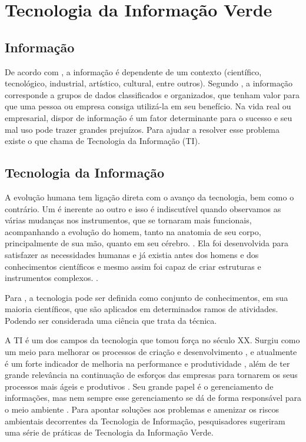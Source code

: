 %
%

\chapter{Tecnologia da Informação Verde}

\section{Informação}

De acordo com , a informação é dependente de um contexto (científico, tecnológico, industrial, artístico, cultural, entre outros). Segundo , a informação corresponde a grupos de dados classificados e organizados, que tenham valor para que uma pessoa ou empresa consiga utilizá-la em seu benefício. Na vida real ou empresarial, dispor de informação é um fator determinante para o sucesso e seu mal uso pode trazer grandes prejuízos. Para ajudar a resolver esse problema existe o que chama de Tecnologia da Informação (TI).

\section{Tecnologia da Informação}

A evolução humana tem ligação direta com o avanço da tecnologia, bem como o contrário. Um é inerente ao outro e isso é indiscutível quando observamos as várias mudanças nos instrumentos, que se tornaram mais funcionais, acompanhando a evolução do homem, tanto na anatomia de seu corpo, principalmente de sua mão, quanto em seu cérebro. \cite[p. 107-111]{acevedo1998ciencia}. Ela foi desenvolvida para satisfazer as necessidades humanas e já existia antes dos homens e dos conhecimentos científicos e mesmo assim foi capaz de criar estruturas e instrumentos complexos. \cite{acevedo1998ciencia, veraszto2004projeto}. 

Para , a tecnologia pode ser definida como conjunto de conhecimentos, em sua maioria científicos, que são aplicados em determinados ramos de atividades. Podendo ser considerada uma ciência que trata da técnica.

A TI é um dos campos da tecnologia que tomou força no século XX. Surgiu como um meio para melhorar os processos de criação e desenvolvimento \cite[p. 2]{de1996tecnologia}, e atualmente é um forte indicador de melhoria na performance e produtividade \cite[p. 2]{lunardi2001efeitos}, além de ter grande relevância na continuação de esforços das empresas para tornarem os seus processos mais ágeis e produtivos \cite{shaw1997information}. Seu grande papel é o gerenciamento de informações, mas nem sempre esse gerenciamento se dá de forma responsável para o meio ambiente \cite[p. 6-7]{silva2011}. Para apontar soluções aos problemas e amenizar os riscos ambientais decorrentes da Tecnologia de Informação, pesquisadores sugeriram uma série de práticas de Tecnologia da Informação Verde.

